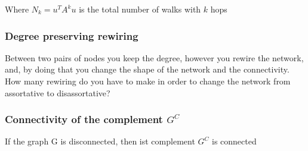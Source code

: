 Where $N_k = u^T A^k u$ is the total number of walks with $k$ hops

\subsubsection{Degree preserving rewiring}
Between two pairs of nodes you keep the degree, however you rewire the network, and, by doing
that you change the shape of the network and the connectivity. How many rewiring do you have to 
make in order to change the network from assortative to disassortative?

\subsubsection{Connectivity of the complement $G^C$}
If the graph G is disconnected, then ist complement $G^C$ is connected

